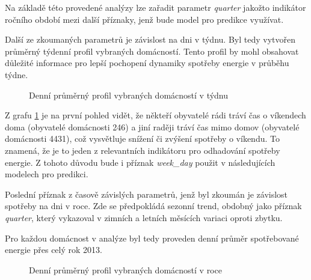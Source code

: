 \documentclass[FM,BP,fonts]{tulthesis}
\begin{document}
Na základě této provedené analýzy lze zařadit parametr \textit{quarter} jakožto indikátor ročního období mezi další příznaky, jenž bude model pro predikce využívat.

Další ze zkoumaných parametrů je závislost na dni v týdnu. Byl tedy vytvořen průměrný týdenní profil vybraných domácností. Tento profil by mohl obsahovat důležité informace pro lepší pochopení dynamiky spotřeby energie v průběhu týdne. 

\begin{figure}[htbp]
	\centering
	\caption{Denní průměrný profil vybraných domácností v týdnu}
	\label{fig:tyden_avg_group}
\end{figure}

Z grafu \ref{fig:tyden_avg_group} je na první pohled vidět, že někteří obyvatelé rádi tráví čas o víkendech doma (obyvatelé domácnosti 246) a jiní raději tráví čas mimo domov (obyvatelé domácnosti 4431), což vysvětluje snížení či zvýšení spotřeby o víkendu. To znamená, že je to jeden z relevantních indikátoru pro odhadování spotřeby energie. Z tohoto důvodu bude i příznak \textit{week\_day} použit v následujících modelech pro predikci.

Poslední příznak z časově závislých parametrů, jenž byl zkoumán je závislost spotřeby na dni v roce. Zde se předpokládá sezonní trend, obdobný jako příznak \textit{quarter}, který vykazoval v zimních a letních měsících variaci oproti zbytku. 

Pro každou domácnost v analýze byl tedy proveden denní průměr spotřebované energie přes celý rok 2013. 

\begin{figure}[htbp]
	\centering
	\caption{Denní průměrný profil vybraných domácností v roce}
	\label{fig:year_avg_all}
\end{figure}
\end{document}

